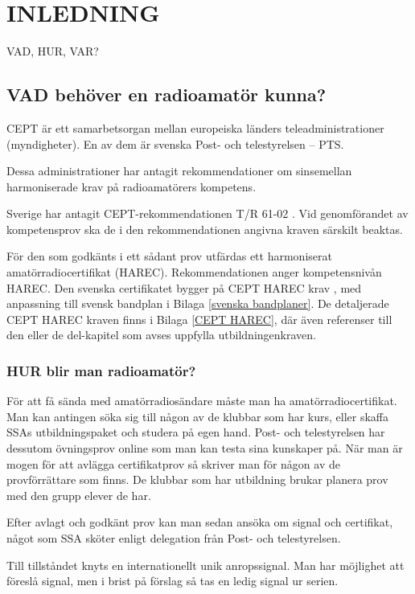 \chapter*{INLEDNING}

\Huge{VAD, HUR, VAR?}\normalsize

\section*{VAD behöver en radioamatör kunna?}

CEPT är ett samarbetsorgan mellan europeiska länders teleadministrationer
(myndigheter). En av dem är svenska Post- och telestyrelsen -- PTS.

Dessa administrationer har antagit rekommendationer om sinsemellan
harmoniserade krav på radioamatörers kompetens.

Sverige har antagit CEPT-rekommendationen T/R 61-02 \cite{TR6102}.
Vid genomförandet av kompetensprov ska de i den rekommendationen
angivna kraven särskilt beaktas.

För den som godkänts i ett sådant prov utfärdas ett harmoniserat
amatörradiocertifikat (HAREC).
Rekommendationen anger kompetensnivån HAREC.
Den svenska certifikatet bygger på CEPT HAREC krav \cite{TR6102},
med anpassning till svensk bandplan i Bilaga \ref{svenska bandplaner}.
De detaljerade CEPT HAREC kraven finns i Bilaga \ref{CEPT HAREC}, där även
referenser till den eller de del-kapitel som avses uppfylla utbildningenkraven.

\subsection*{HUR blir man radioamatör?}

För att få sända med amatörradiosändare måste man ha amatörradiocertifikat.
Man kan antingen söka sig till någon av de klubbar som har kurs, eller skaffa
SSAs utbildningspaket och studera på egen hand. Post- och telestyrelsen har
dessutom övningsprov online som man kan testa sina kunskaper på.
När man är mogen för att avlägga certifikatprov så skriver man för någon av de
provförrättare som finns. De klubbar som har utbildning brukar planera prov
med den grupp elever de har.

Efter avlagt och godkänt prov kan man sedan ansöka om signal och certifikat,
något som SSA sköter enligt delegation från Post- och telestyrelsen.

Till tillståndet knyts en internationellt unik anropssignal. Man har möjlighet
att föreslå signal, men i brist på förslag så tas en ledig signal ur serien.

